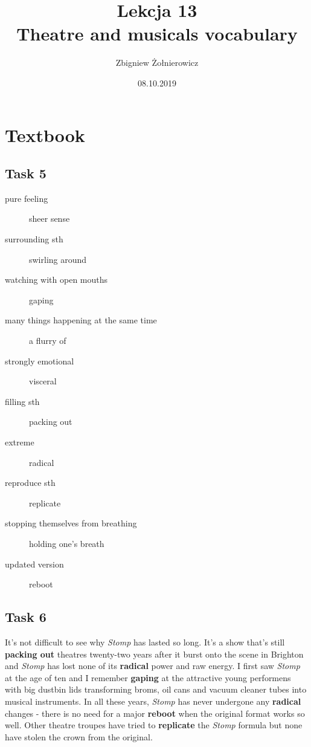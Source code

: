 \documentclass[a4paper]{article}
\begin{document}
\title{{\huge Lekcja 13} \\
{\large Theatre and musicals vocabulary}}
\author{Zbigniew Żołnierowicz}
\date{08.10.2019}
\maketitle
\section{Textbook}
\subsection{Task 5}
\begin{description}
    \item[pure feeling] sheer sense
    \item[surrounding sth] swirling around
    \item[watching with open mouths] gaping
    \item[many things happening at the same time] a flurry of
    \item[strongly emotional] visceral
    \item[filling sth] packing out
    \item[extreme] radical
    \item[reproduce sth] replicate
    \item[stopping themselves from breathing] holding one's breath
    \item[updated version] reboot
\end{description}
\subsection{Task 6}
It's not difficult to see why \emph{Stomp} has lasted so long. It's a show that's still {\bf packing out} theatres twenty-two years after it burst onto the scene in Brighton and \emph{Stomp} has lost none of its {\bf radical} power and raw energy. I first saw \emph{Stomp} at the age of ten and I remember {\bf gaping} at the attractive young performens with big dustbin lids transforming broms, oil  cans and vacuum cleaner tubes into musical instruments. In all these years, \emph{Stomp} has never undergone any {\bf radical} changes - there is no need for a major {\bf reboot} when the original format works so well. Other theatre troupes have tried to {\bf replicate} the \emph{Stomp} formula but none have stolen the crown from the original.
\end{document}
